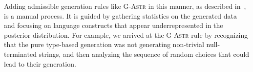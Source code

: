 Adding admissible generation rules like \textsc{G-Astr} in this
manner, as described in~\citet{PalkaAST11}, is a manual process. It is
guided by gathering statistics on the generated data and focusing on
language constructs that appear underrepresented in the posterior
distribution. For example, we arrived at the \textsc{G-Astr} rule by
recognizing that the pure type-based generation was not generating
non-trivial null-terminated strings, and then analyzing the sequence
of random choices that could lead to their generation.

%  
%  
%  
